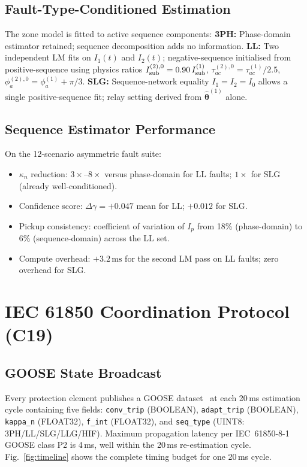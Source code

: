 \documentclass[journal,twoside]{IEEEtran}
\begin{document}
\subsection{Fault-Type-Conditioned Estimation}

The zone model is fitted to active sequence components:
\textbf{3PH:} Phase-domain estimator retained; sequence decomposition adds no
information.
\textbf{LL:} Two independent LM fits on $I_1(t)$ and $I_2(t)$; negative-sequence
initialised from positive-sequence using physics ratios
$I_{\rm sub}^{(2),0} = 0.90\,I_{\rm sub}^{(1)}$,
$\tau_{ac}^{(2),0} = \tau_{ac}^{(1)}/2.5$,
$\phi_a^{(2),0} = \phi_a^{(1)} + \pi/3$.
\textbf{SLG:} Sequence-network equality $I_1 = I_2 = I_0$ allows a single
positive-sequence fit; relay setting derived from $\hat{\bm{\theta}}^{(1)}$ alone.

\subsection{Sequence Estimator Performance}

On the 12-scenario asymmetric fault suite:
\begin{itemize}
  \item $\kappa_n$ reduction: $3\times$--$8\times$ versus phase-domain
        for LL faults; $1\times$ for SLG (already well-conditioned).
  \item Confidence score: $\Delta\gamma = +0.047$ mean for LL;
        $+0.012$ for SLG.
  \item Pickup consistency: coefficient of variation of $I_p$ from
        18\% (phase-domain) to 6\% (sequence-domain) across the LL set.
  \item Compute overhead: $+3.2\,\text{ms}$ for the second LM pass on LL
        faults; zero overhead for SLG.
\end{itemize}

\section{IEC 61850 Coordination Protocol (C19)}
\label{sec:coord}

\subsection{GOOSE State Broadcast}

Every protection element publishes a GOOSE dataset~\cite{IEC61850} at each
20\,ms estimation cycle containing five fields:
\texttt{conv\_trip} (BOOLEAN),
\texttt{adapt\_trip} (BOOLEAN),
\texttt{kappa\_n} (FLOAT32),
\texttt{f\_int} (FLOAT32), and
\texttt{seq\_type} (UINT8: 3PH/LL/SLG/LLG/HIF).
Maximum propagation latency per IEC~61850-8-1 GOOSE class P2 is 4\,ms, well
within the 20\,ms re-estimation cycle.
Fig.~\ref{fig:timeline} shows the complete timing budget for one 20\,ms cycle.
\end{document}
